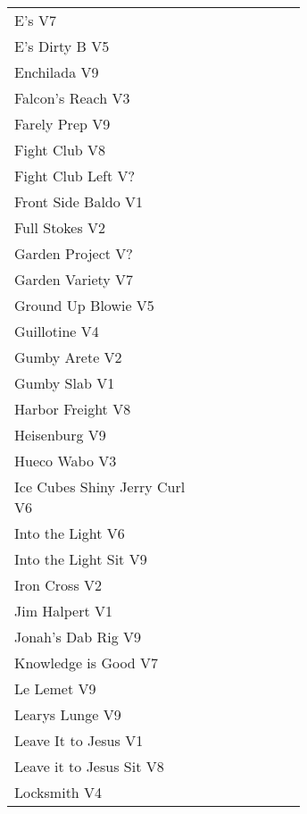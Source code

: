 \begin{center}
\begin{supertabular}{p{0.65\linewidth}r}
E's V7 & \pageref{rt:E's} \\
E's Dirty B V5 & \pageref{rt:E's Dirty B} \\
Enchilada V9 & \pageref{rt:Enchilada} \\
Falcon's Reach V3 & \pageref{rt:Falcon's Reach} \\
Farely Prep V9 & \pageref{rt:Farely Prep} \\
Fight Club V8 & \pageref{rt:Fight Club} \\
Fight Club Left V? & \pageref{rt:Fight Club Left} \\
Front Side Baldo V1 & \pageref{rt:Front Side Baldo} \\
Full Stokes V2 & \pageref{rt:Full Stokes} \\
Garden Project V? & \pageref{rt:Garden Project} \\
Garden Variety V7 & \pageref{rt:Garden Variety} \\
Ground Up Blowie V5 & \pageref{rt:Ground Up Blowie} \\
Guillotine V4 & \pageref{rt:Guillotine} \\
Gumby Arete V2 & \pageref{rt:Gumby Arete} \\
Gumby Slab V1 & \pageref{rt:Gumby Slab} \\
Harbor Freight V8 & \pageref{vr:Harbor Freight} \\
Heisenburg V9 & \pageref{rt:Heisenburg} \\
Hueco Wabo V3 & \pageref{rt:Hueco Wabo} \\
Ice Cubes Shiny Jerry Curl V6 & \pageref{rt:Ice Cubes Shiny Jerry Curl} \\
Into the Light V6 & \pageref{rt:Into the Light} \\
Into the Light Sit V9 & \pageref{vr:Into the Light Sit} \\
Iron Cross V2 & \pageref{vr:Iron Cross} \\
Jim Halpert V1 & \pageref{rt:Jim Halpert} \\
Jonah's Dab Rig V9 & \pageref{rt:Jonah's Dab Rig} \\
Knowledge is Good V7 & \pageref{rt:Knowledge is Good} \\
Le Lemet V9 & \pageref{rt:Le Lemet} \\
Learys Lunge V9 & \pageref{rt:Learys Lunge} \\
Leave It to Jesus V1 & \pageref{rt:Leave It to Jesus} \\
Leave it to Jesus Sit V8 & \pageref{vr:Leave it to Jesus Sit} \\
Locksmith V4 & \pageref{rt:Locksmith} \\

\end{supertabular}
\end{center}
